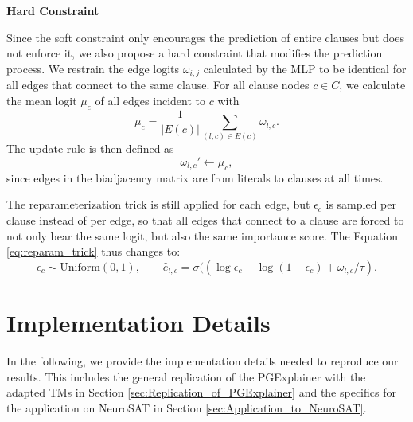 \textbf{Hard Constraint}\par
Since the soft constraint only encourages the prediction of entire clauses but does not enforce it, we also propose a hard constraint that modifies the prediction process. We restrain the edge logits $\omega_{i,j}$ calculated by the MLP to be identical for all edges that connect to the same clause. %
For all clause nodes $c \in C$, we calculate the mean logit $\mu_c$ of all edges incident to $c$ with
\begin{equation}
    \mu_c = \frac{1}{|E(c)|} \sum_{(l,c)\in E(c)}\omega_{l,c}.
\end{equation}
The update rule is then defined as 
\begin{equation}
    \omega_{l,c}'\leftarrow \mu_c,
\end{equation}
since edges in the biadjacency matrix are from literals to clauses at all times.


The reparameterization trick is still applied for each edge, but $\epsilon_c$ is sampled per clause instead of per edge, so that all edges that connect to a clause are forced to not only bear the same logit, but also the same importance score. The Equation \ref{eq:reparam_trick} thus changes to:
\begin{equation}
    \epsilon_c \sim \text{Uniform}(0,1), \qquad \hat{e}_{l,c}=\sigma((\log \epsilon_c - \log(1-\epsilon_c)+\omega_{l,c}/\tau).
\end{equation}


\section{Implementation Details}
\label{sec:implementation_details}
In the following, we provide the implementation details needed to reproduce our results. This includes the general replication of the PGExplainer \cite{luo2020parameterized} with the adapted \acp{TM} in Section \ref{sec:Replication_of_PGExplainer} and the specifics for the application on NeuroSAT \cite{selsam2018learning} in Section \ref{sec:Application_to_NeuroSAT}.


